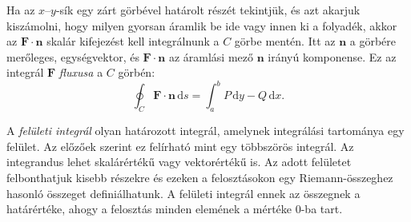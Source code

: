 \documentclass[%
	DIV=15,appendixprefix]{scrreprt}
\theoremstyle{definition}
\theoremstyle{remark}
\begin{document}
Ha az $ x $--$ y $-sík egy zárt görbével határolt részét tekintjük, és azt akarjuk kiszámolni, hogy
milyen gyorsan áramlik be ide vagy innen ki a folyadék, akkor az $ \mathbf{ F } \cdot \mathbf{ n } $
skalár kifejezést kell integrálnunk a $ C $ görbe mentén. Itt az $ \mathbf{ n }$ a görbére
merőleges,  egységvektor, és $ \mathbf{ F } \cdot \mathbf{ n }$ az áramlási
mező $ \mathbf{ n } $ irányú komponense. Ez az integrál $ \mathbf{ F } $ \emph{fluxusa} a $ C $
görbén:
\begin{equation*}
	\oint_{ C } \mathbf{ F } \cdot \mathbf{ n } \, \mathrm{ d } s = \int_{ a }^{ b } P \,
	\mathrm{ d } y - Q \, \mathrm{ d } x.
\end{equation*}
%

A \emph{felületi integrál} olyan határozott integrál, amelynek integrálási tartománya egy felület.
Az előzőek szerint ez felírható mint egy többszörös integrál. Az integrandus lehet skalárértékű
vagy vektorértékű is. Az adott felületet felbonthatjuk kisebb részekre és ezeken a felosztásokon egy
Riemann-összeghez hasonló összeget definiálhatunk. A felületi integrál ennek az összegnek a
határértéke, ahogy a felosztás minden elemének a mértéke 0-ba tart.
\end{document}

